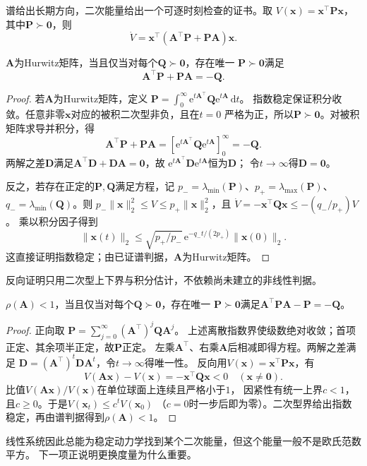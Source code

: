 谱给出长期方向，二次能量给出一个可逐时刻检查的证书。取
$V(\bm x)=\bm x^\top\bm P\bm x$，其中$\bm P\succ\bm0$，则
\begin{equation}
  \dot V=\bm x^\top(\bm A^\top\bm P+\bm P\bm A)\bm x.
  \label{eq:dynamical-continuous-lyapunov-derivative}
\end{equation}
\begin{theorem}[线性Lyapunov方程]
  \label{thm:dynamical-linear-lyapunov-equation}
  $\bm A$为Hurwitz矩阵，当且仅当对每个$\bm Q\succ\bm0$，存在唯一
  $\bm P\succ\bm0$满足
  \begin{equation}
    \bm A^\top\bm P+\bm P\bm A=-\bm Q.
    \label{eq:dynamical-continuous-lyapunov-equation}
  \end{equation}
\end{theorem}
\begin{proof}
  若$\bm A$为Hurwitz矩阵，定义
  $\bm P=\int_0^\infty\mathrm e^{t\bm A^\top}\bm Q\mathrm e^{t\bm A}\,\mathrm dt$。
  指数稳定保证积分收敛。任意非零$\bm x$对应的被积二次型非负，且在$t=0$
  严格为正，所以$\bm P\succ\bm0$。对被积矩阵求导并积分，得
  \[
    \bm A^\top\bm P+\bm P\bm A
    =[\mathrm e^{t\bm A^\top}\bm Q\mathrm e^{t\bm A}]_0^\infty=-\bm Q.
  \]
  两解之差$\bm D$满足$\bm A^\top\bm D+\bm D\bm A=\bm0$，故
  $\mathrm e^{t\bm A^\top}\bm D\mathrm e^{t\bm A}$恒为$\bm D$；
  令$t\to\infty$得$\bm D=\bm0$。

  反之，若存在正定的$\bm P,\bm Q$满足方程，记
  $p_-=\lambda_{\min}(\bm P)$、$p_+=\lambda_{\max}(\bm P)$、
  $q_-=\lambda_{\min}(\bm Q)$。则
  $p_-\|\bm x\|_2^2\leq V\leq p_+\|\bm x\|_2^2$，且
  $\dot V=-\bm x^\top\bm Q\bm x\leq-(q_-/p_+)V$。
  乘以积分因子得到
  \[
    \|\bm x(t)\|_2
    \leq\sqrt{p_+/p_-}\,
      \mathrm e^{-q_-t/(2p_+)}\|\bm x(0)\|_2.
  \]
  这直接证明指数稳定；由已证谱判据，$\bm A$为Hurwitz矩阵。
\end{proof}
反向证明只用二次型上下界与积分估计，不依赖尚未建立的非线性判据。

\begin{theorem}[离散时间Lyapunov方程]
  \label{thm:dynamical-discrete-lyapunov-equation}
  $\rho(\bm A)<1$，当且仅当对每个$\bm Q\succ\bm0$，存在唯一
  $\bm P\succ\bm0$满足$\bm A^\top\bm P\bm A-\bm P=-\bm Q$。
\end{theorem}
\begin{proof}
  正向取
  $\bm P=\sum_{j=0}^\infty(\bm A^\top)^j\bm Q\bm A^j$。
  上述离散指数界使级数绝对收敛；首项正定、其余项半正定，故$\bm P$正定。
  左乘$\bm A^\top$、右乘$\bm A$后相减即得方程。两解之差满足
  $\bm D=(\bm A^\top)^t\bm D\bm A^t$，令$t\to\infty$得唯一性。
  反向用$V(\bm x)=\bm x^\top\bm P\bm x$，有
  \[
    V(\bm A\bm x)-V(\bm x)=-\bm x^\top\bm Q\bm x<0
    \quad(\bm x\neq\bm0).
  \]
  比值$V(\bm A\bm x)/V(\bm x)$在单位球面上连续且严格小于$1$，
  因紧性有统一上界$c<1$，且$c\geq0$。于是$V(\bm x_t)\leq c^t V(\bm x_0)$
  （$c=0$时一步后即为零）。二次型界给出指数稳定，再由谱判据得到$\rho(\bm A)<1$。
\end{proof}
线性系统因此总能为稳定动力学找到某个二次能量，但这个能量一般不是欧氏范数平方。
下一项正说明更换度量为什么重要。

